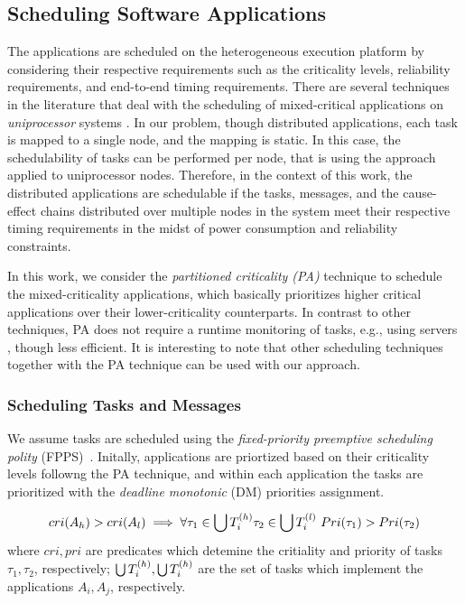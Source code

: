 \subsection{Scheduling Software Applications}
The applications are scheduled on the heterogeneous execution platform by considering their respective requirements such as the criticality levels, reliability requirements, and end-to-end timing requirements. There are several techniques in the literature that deal with the scheduling of mixed-critical applications on \textit{uniprocessor} systems \cite{Vestal2007PreemptiveAssurance}. In our problem, though distributed applications, each task is mapped to a single node, and the mapping is static. In this case, the schedulability of tasks can be performed per node, that is using the approach applied to uniprocessor nodes. Therefore, in the context of this work, the distributed applications are schedulable if the tasks, messages, and the cause-effect chains distributed over multiple nodes in the system meet their respective timing requirements in the midst of power consumption and reliability constraints. 

In this work, we consider the \textit{partitioned criticality (PA)}  technique to schedule the mixed-criticality applications, which basically prioritizes higher critical applications over their lower-criticality counterparts. In contrast to other techniques, PA does not require a runtime monitoring of tasks, e.g., using servers \cite{AbeniIntegratingSystems,Ashjaei2017DesigningSystems,Inam2014ThePlatforms}, though less efficient. It is interesting to note that other scheduling techniques together with the PA technique can be used with our approach.

\subsubsection{Scheduling Tasks and Messages}\label{subsec_responsetimeanalysis}
We assume tasks are scheduled using the \textit{fixed-priority preemptive scheduling polity} (FPPS)~\cite{Sha-RTS-2004}. Initally, applications are priortized based on their criticality levels followng the PA technique, and within each application the tasks are prioritized with the \textit{deadline monotonic} (DM) priorities assignment. 

\[cri(A_h)>cri(A_l)\implies \forall \tau_1\in\bigcup\sss{T}[h]\tau_2\in\bigcup\sss{T}[l]\ Pri(\tau_1)>Pri(\tau_2)\]
where $cri, pri$ are predicates which detemine the critiality and priority of tasks $\tau_1,\tau_2$, respectively; $\bigcup\sss{T}[h], \bigcup\sss{T}[h]$ are the set of tasks which implement the applications $A_i,A_j$, respectively.


